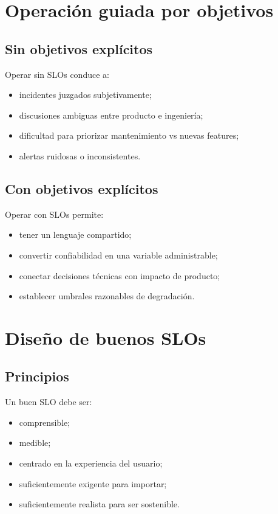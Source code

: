 \documentclass[variant=apuntes,cover=institutional,mode=screen]{ua-engineering-v6-article}
\begin{document}
\section{Operación guiada por objetivos}

\subsection{Sin objetivos explícitos}

Operar sin SLOs conduce a:
\begin{itemize}
\item incidentes juzgados subjetivamente;
\item discusiones ambiguas entre producto e ingeniería;
\item dificultad para priorizar mantenimiento vs nuevas features;
\item alertas ruidosas o inconsistentes.
\end{itemize}

\subsection{Con objetivos explícitos}

Operar con SLOs permite:
\begin{itemize}
\item tener un lenguaje compartido;
\item convertir confiabilidad en una variable administrable;
\item conectar decisiones técnicas con impacto de producto;
\item establecer umbrales razonables de degradación.
\end{itemize}

\section{Diseño de buenos SLOs}

\subsection{Principios}

Un buen SLO debe ser:
\begin{itemize}
\item comprensible;
\item medible;
\item centrado en la experiencia del usuario;
\item suficientemente exigente para importar;
\item suficientemente realista para ser sostenible.
\end{itemize}
\end{document}
